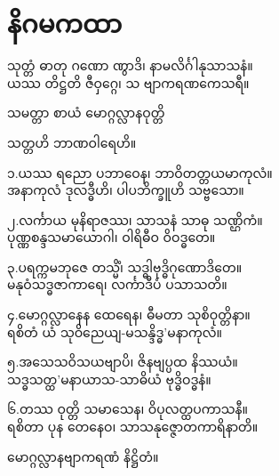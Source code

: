 \chapter*{နိဂမကထာ}

\begin{song}
သုတ္တံ ဓာတု ဂဏော ဏွာဒိ၊ နာမလိင်္ဂါနုသာသနံ။\\
ယဿ တိဋ္ဌတိ ဇီဝှဂ္ဂေ၊ သ ဗျာကရဏကေသရီ။
\end{song}

\begin{jieshu}
သမတ္တာ စာယံ မောဂ္ဂလ္လာနဝုတ္တိ

သတ္တဟိ ဘာဏဝါရေဟိ။
\end{jieshu}


\begin{song}
၁.ယဿ ရညော ပဘာဝေန၊ ဘာဝိတတ္တယမာကုလံ။\\
အနာကုလံ ဒုလဒ္ဓီဟိ၊ ပါပဘိက္ခူဟိ သဗ္ဗသော။

၂.လင်္ကာယ မုနိရာဇဿ၊ သာသနံ သာဓု သဏ္ဌိကံ။\\
ပုဏ္ဏစန္ဒသမာယောဂါ၊ ဝါရိဓီဝ ဝိဝဒ္ဓတေ။

၃.ပရက္ကမဘုဇေ တသ္မိံ၊ သဒ္ဓါဗုဒ္ဓိဂုဏောဒိတေ။\\
မနုဝံသဒ္ဓဇာကာရေ၊ လင်္ကာဒီပံ ပသာသတိ။

၄.မောဂ္ဂလ္လာနေန ထေရေန၊ ဓီမတာ သုစိဝုတ္တိနာ။\\
ရစိတံ ယံ သုဝိညေယျ-မသန္ဒိဒ္ဓ’မနာကုလံ။

၅.အသေသဝိသယဗျာပိ၊ ဇိနဗျပ္ပထ နိဿယံ။\\
သဒ္ဓသတ္ထ’မနာယာသ-သာဓိယံ ဗုဒ္ဓိဝဒ္ဓနံ။

၆.တဿ ဝုတ္တိ သမာသေန၊ ဝိပုလတ္ထပကာသနီ။\\
ရစိတာ ပုန တေနေဝ၊ သာသနုဇ္ဇောတကာရိနာတိ။
\end{song}


\begin{jieshu}
မောဂ္ဂလ္လာနဗျာကရဏံ နိဋ္ဌိတံ။
\end{jieshu}
